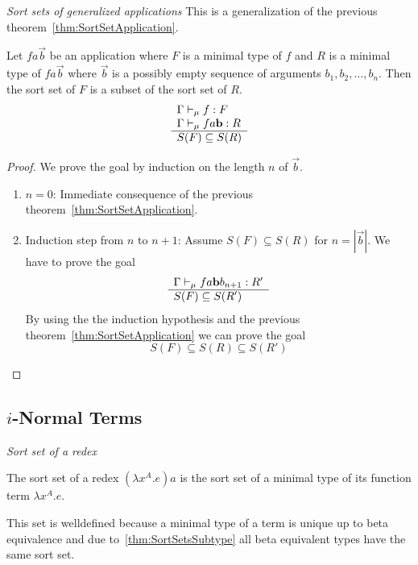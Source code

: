 \begin{theorem}
    \label{thm:SortSetApplications}
    \emph{Sort sets of generalized applications} This is a generalization of the
    previous theorem~\ref{thm:SortSetApplication}.

    Let $fa \vec b$ be an application where
    $F$ is a minimal type of $f$ and $R$ is a minimal type of $fa \vec b$ where
    $\vec b$ is a possibly empty sequence of arguments $b_1, b_2, \ldots, b_n$.
    Then the sort set of $F$ is a subset of the sort set of $R$.
    $$
    \begin{array}{l} 
        \Gamma \vdash_\mu f : F
        \\
        \Gamma \vdash_\mu f a {\mathbf b} : R
     \\ \hline 
        S(F) \subseteq S(R)
    \end{array}
    $$
    \begin{proof}
        We prove the goal by induction on the length $n$ of $\vec b$.
        \begin{enumerate}
            \item $n=0$: Immediate consequence of the previous
                theorem~\ref{thm:SortSetApplication}.

            \item Induction step from $n$ to $n+1$:
                Assume $S(F) \subseteq S(R)$ for $n = |\vec b|$. We have to
                prove the goal
                $$
                \begin{array}{l} 
                    \Gamma \vdash_\mu f a {\mathbf b} b_{n+1} : R'
                 \\ \hline 
                    S(F) \subseteq S(R')
                \end{array}
                $$
                By using the the induction hypothesis and the previous
                theorem~\ref{thm:SortSetApplication} we can prove the goal
                $$
                    S(F) \subseteq S(R) \subseteq S(R')
                $$
        \end{enumerate}
    \end{proof}
\end{theorem}






\subsection{$i$-Normal Terms}


\begin{definition}
    \label{def:RedexSortSet}
    \emph{Sort set of a redex}

    The sort set of a redex $(\lambda x^A. e) a$ is the sort set of a
    minimal type of its function term $\lambda x^A. e$.

    This set is welldefined because a minimal type of a term is unique up to
    beta equivalence and due to~\ref{thm:SortSetsSubtype} all beta equivalent
    types have the same sort set.
\end{definition}





